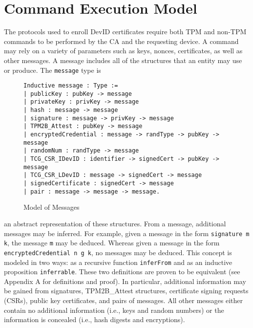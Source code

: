 
\chapter{Command Execution Model}




The protocols used to enroll DevID certificates require both TPM and non-TPM commands to be performed by the CA and the requesting device. A command may rely on a variety of parameters such as keys, nonces, certificates, as well as other messages. A message includes all of the structures that an entity may use or produce. The \verb|message| type is 
\begin{figure}[h]
\begin{lstlisting}[language=Coq]
Inductive message : Type :=
| publicKey : pubKey -> message
| privateKey : privKey -> message
| hash : message -> message
| signature : message -> privKey -> message
| TPM2B_Attest : pubKey -> message
| encryptedCredential : message -> randType -> pubKey -> message
| randomNum : randType -> message
| TCG_CSR_IDevID : identifier -> signedCert -> pubKey -> message
| TCG_CSR_LDevID : message -> signedCert -> message
| signedCertificate : signedCert -> message
| pair : message -> message -> message.
\end{lstlisting}
\caption{Model of Messages}
\end{figure}
an abstract representation of these structures. From a message, additional messages may be inferred. For example, given a message in the form \verb|signature m k|, the message \verb|m| may be deduced. Whereas given a message in the form \verb|encryptedCredential n g k|, no messages may be deduced. This concept is modeled in two ways: as a recursive function \verb|inferFrom| and as an inductive proposition \verb|inferrable|. These two definitions are proven to be equivalent (see Appendix A for definitions and proof). In particular, additional information may be gained from signatures, TPM2B\_Attest structures, certificate signing requests (CSRs), public key certificates, and pairs of messages. All other messages either contain no additional information (i.e., keys and random numbers) or the information is concealed (i.e., hash digests and encryptions). 



